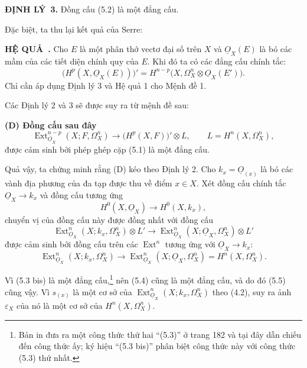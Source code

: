 \documentclass[11pt,twoside,openany]{book}
\numberwithin{equation}{section}
\newcommand{\src}[1]{%
  \phantomsection\hypertarget{src:\fgasourceid:#1}{}%
  \marginpar{\raggedleft\footnotesize\sffamily #1}%
}
\newcommand{\fgasourceid}{unset}
\newcommand{\Osh}{\underline{O}}
\newcommand{\result}[2]{\par\medskip\noindent\textbf{#1\if\relax\detokenize{#2}\relax\else\ #2\fi.}\quad}
\begin{document}
\result{ĐỊNH LÝ}{3} Đồng cấu (5.2) là một đẳng cấu.

Đặc biệt, ta thu lại kết quả của Serre:

\result{HỆ QUẢ}{} Cho $E$ là một phân thớ vectơ đại số trên $X$ và
$\Osh_X(E)$ là bó các mầm của các tiết diện chính quy của $E$. Khi đó ta có các
đẳng cấu chính tắc:
\begin{equation}\tag{5.3}
  \bigl(H^{p}(X,\Osh_X(E))\bigr)'
  =H^{n-p}\bigl(X,\Omega_X^{n}\otimes\Osh_X(E')\bigr).
\end{equation}
Chỉ cần áp dụng Định lý 3 và Hệ quả 1 cho Mệnh đề 1.

Các Định lý 2 và 3 sẽ được suy ra từ mệnh đề sau:

\noindent\textbf{(D) Đồng cấu sau đây}
\begin{equation}\tag{5.2 bis}
  \operatorname{Ext}_{\Osh_X}^{n-p}(X;F,\Omega_X^{n})
  \longrightarrow\bigl(H^{p}(X,F)\bigr)'\otimes L,
  \qquad L=H^{n}(X,\Omega_X^{n}),
\end{equation}
được cảm sinh bởi phép ghép cặp (5.1) là một đẳng cấu.

Quả vậy, ta chứng minh rằng (D) kéo theo Định lý 2. Cho
$k_x=\Osh_{(x)}$ là bó các vành địa phương của đa tạp được thu về điểm
$x\in X$. Xét đồng cấu chính tắc
$\Osh_X\longrightarrow k_x$ và đồng cấu tương ứng
\begin{equation}\tag{5.3 bis}
  H^{0}(X,\Osh_X)\longrightarrow H^{0}(X,k_x),
\end{equation}
chuyển vị của đồng cấu này được đồng nhất với đồng cấu
\begin{equation}\tag{5.4}
  \operatorname{Ext}_{\Osh_X}^{n}(X;k_x,\Omega_X^{n})\otimes L'
  \longrightarrow
  \operatorname{Ext}_{\Osh_X}^{n}(X;\Osh_X,\Omega_X^{n})\otimes L'
\end{equation}
được cảm sinh bởi đồng cấu trên các $\operatorname{Ext}^{n}$ tương ứng với
$\Osh_X\longrightarrow k_x$:
\begin{equation}\tag{5.5}
  \operatorname{Ext}_{\Osh_X}^{n}(X;k_x,\Omega_X^{n})
  \longrightarrow
  \operatorname{Ext}_{\Osh_X}^{n}(X;\Osh_X,\Omega_X^{n})
  =H^{n}(X,\Omega_X^{n}).
\end{equation}

\src{183}
Vì (5.3 bis) là một đẳng cấu,\footnote{Bản in đưa ra một công thức thứ hai
``(5.3)'' ở trang 182 và tại đây dẫn chiếu đến công thức ấy; ký hiệu
``(5.3 bis)'' phân biệt công thức này với công thức (5.3) thứ nhất.} nên
(5.4) cũng là một đẳng cấu, và do đó (5.5) cũng vậy. Vì $s_{(x)}$ là một cơ
sở của $\operatorname{Ext}_{\Osh_X}^{n}(X;k_x,\Omega_X^{n})$ theo (4.2), suy
ra ảnh $\varepsilon_X$ của nó là một cơ sở của
$H^{n}(X,\Omega_X^{n})$.
\end{document}
